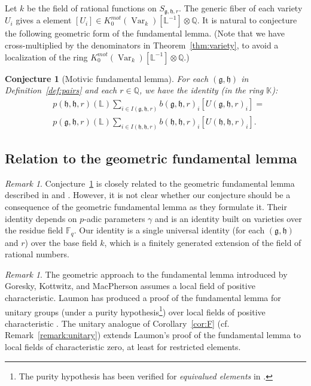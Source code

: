 \documentclass[11pt]{amsart}
\newtheorem{conjecture}[theorem]{Conjecture}
\theoremstyle{definition}
\theoremstyle{remark}
\newtheorem{remark}[theorem]{Remark}
\numberwithin{equation}{theorem}
\def\f{{\mathbb{F}_q}}
\newcommand{\ring}[1]{\mathbb{#1}}
\def\op#1{\operatorname{#1}}
\def\lie#1{{\mathfrak{#1}}}
\def\mot{{K_0^{mot}(\op{Var}_k)[\ring{L}^{-1}]\otimes\ring{Q}}}
\begin{document}
Let $k$ be the field of rational functions on
$S_{\lie{g},\lie{h},r}$. The generic fiber of each variety $U_i$
gives a element $[U_i]\in \mot$. It is natural to conjecture the
following geometric form of the fundamental lemma.  (Note that we
have cross-multiplied by the denominators in
Theorem~\ref{thm:variety}, to avoid a localization of the ring
$\mot$.)

\begin{conjecture}[Motivic fundamental lemma]\label{conj:gfl}
For each $(\lie{g},\lie{h})$ in Definition~\ref{def:pairs} and
each $r\in\ring{Q}$, we have the identity (in the ring
$\ring{K}$):
  \begin{equation}
  \begin{array}{lll}
  &{p(\lie{h},\lie{h},r)(\ring{L})}\sum_{i\in I(\lie{g},\lie{h},r)}
   b(\lie{g},\lie{h},r)_i
   [U(\lie{g},\lie{h},r)_{i}] =\\
   &{p(\lie{g},\lie{h},r)(\ring{L})} \sum_{i\in I(\lie{h},\lie{h},r)}
   b(\lie{h},\lie{h},r)_i
   [U(\lie{h},\lie{h},r)_{i}].
   \end{array}
  \end{equation}
\end{conjecture}

\subsection{Relation to the geometric fundamental
lemma}\label{sec:gfl}

\begin{remark}
Conjecture~\ref{conj:gfl} is closely related to the geometric
fundamental lemma described in \cite{GKM-fl} and \cite{Lfl}.
However, it is not clear whether our conjecture should be a
consequence of the geometric fundamental lemma as they formulate
it.  Their identity depends on $p$-adic parameters $\gamma$ and is
an identity built on varieties over the residue field $\f$.  Our
identity is a single universal identity (for each
$(\lie{g},\lie{h})$ and $r$) over the base field $k$, which is a
finitely generated extension of the field of rational numbers.
\end{remark}

\begin{remark}
The geometric approach to the fundamental lemma introduced by
Goresky, Kottwitz, and MacPherson assumes a local field of
positive characteristic.  Laumon has produced a proof of the
fundamental lemma for unitary groups (under a purity
hypothesis\footnote{The purity hypothesis has been verified for
{\it equivalued elements} in \cite{GKM-equiv}.}) over local fields
of positive characteristic \cite{Lfl}.  The unitary analogue of
Corollary~\ref{cor:F} (cf. Remark~\ref{remark:unitary}) extends
Laumon's proof of the fundamental lemma to local fields of
characteristic zero, at least for restricted elements.
\end{remark}
\end{document}
